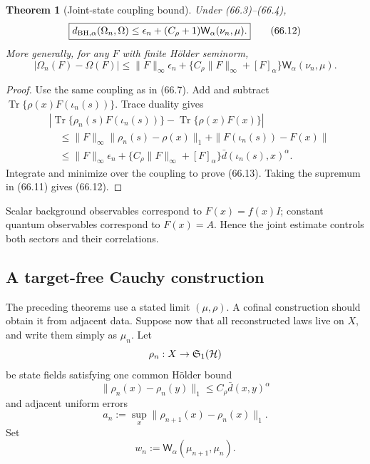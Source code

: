 \documentclass[11pt]{article}
\newtheorem{theorem}{Theorem}[section]
\theoremstyle{remark}
\begin{document}
\begin{theorem}[Joint-state coupling bound]
\label{thm:v12v66-joint}
Under (66.3)--(66.4),
\begin{equation}
 \boxed{
 d_{\rm BH,\alpha}(\Omega_n,\Omega)
 \leq
 \epsilon_n+(C_\rho+1)
 {\mathsf W}_\alpha(\nu_n,\mu).}                  \tag{66.12}
\end{equation}
More generally, for any \(F\) with finite Hölder seminorm,
\begin{equation}
 |\Omega_n(F)-\Omega(F)|
 \leq
 \|F\|_\infty\epsilon_n+
 \{C_\rho\|F\|_\infty+[F]_\alpha\}
 {\mathsf W}_\alpha(\nu_n,\mu).                   \tag{66.13}
\end{equation}
\end{theorem}

\begin{proof}
Use the same coupling as in (66.7).  Add and subtract
\(\operatorname{Tr}\{\rho(x)F(\iota_n(s))\}\).  Trace duality gives
\begin{align}
 &\left|
 \operatorname{Tr}\{\rho_n(s)F(\iota_n(s))\}
 -
 \operatorname{Tr}\{\rho(x)F(x)\}
 \right|                                          \nonumber\\
 &\quad\leq
 \|F\|_\infty\|\rho_n(s)-\rho(x)\|_1
 +
 \|F(\iota_n(s))-F(x)\|                           \nonumber\\
 &\quad\leq
 \|F\|_\infty\epsilon_n+
 \{C_\rho\|F\|_\infty+[F]_\alpha\}
 \bar d(\iota_n(s),x)^\alpha.                     \tag{66.14}
\end{align}
Integrate and minimize over the coupling to prove (66.13).
Taking the supremum in (66.11) gives (66.12).
\end{proof}

Scalar background observables correspond to
\(F(x)=f(x)I\); constant quantum observables correspond to
\(F(x)=A\).  Hence the joint estimate controls both sectors and
their correlations.

\subsection{A target-free Cauchy construction}

The preceding theorems use a stated limit \((\mu,\rho)\).  A
cofinal construction should obtain it from adjacent data.  Suppose
now that all reconstructed laws live on \(X\), and write them simply
as \(\mu_n\).  Let
\[
 \rho_n:X\to{\mathfrak S}_1({\cal H})
\]
be state fields satisfying one common Hölder bound
\begin{equation}
 \|\rho_n(x)-\rho_n(y)\|_1
 \leq C_\rho\bar d(x,y)^\alpha                    \tag{66.15}
\end{equation}
and adjacent uniform errors
\begin{equation}
 a_n:=
 \sup_x\|\rho_{n+1}(x)-\rho_n(x)\|_1.             \tag{66.16}
\end{equation}
Set
\[
                         w_n:={\mathsf W}_\alpha(\mu_{n+1},\mu_n).
\]
\end{document}
